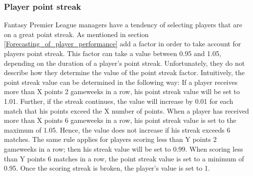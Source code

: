 \subsubsection{Player point streak}
Fantasy Premier League managers have a tendency of selecting players that are on a great point streak. As mentioned in section \ref{Forecasting_of_player_performance} \cite{Bonomo} add a factor in order to take account for players point streak. This factor can take a value between 0.95 and 1.05, depending on the duration of a player's point streak. Unfortunately, they do not describe how they determine the value of the point streak factor. Intuitively, the point streak value can be determined in the following way: 
\newpar
If a player receives more than X points 2 gameweeks in a row, his point streak value will be set to 1.01. Further, if the streak continues, the value will increase by 0.01 for each match that his points exceed the X number of points. When a player has received more than X points 6 gameweeks in a row, his point streak value is set to the maximum of 1.05. Hence, the value does not increase if his streak exceeds 6 matches. The same rule applies for players scoring less than Y points 2 gameweeks in a row; then his streak value will be set to 0.99. When scoring less than Y points 6 matches in a row, the point streak value is set to a minimum of 0.95. Once the scoring streak is broken, the player's value is set to 1. 




